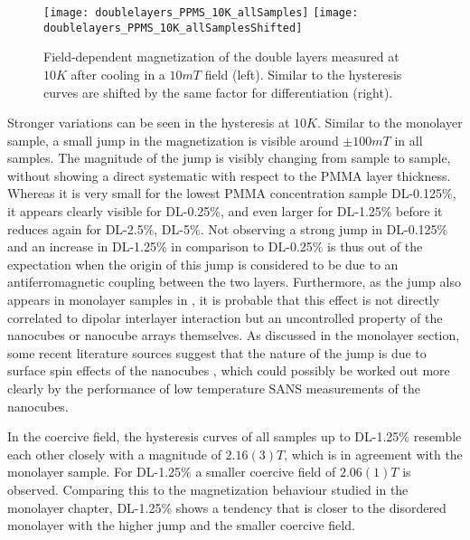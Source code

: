 \documentclass[\main/dresen_thesis.tex]{subfiles}
\begin{document}

    \begin{figure}[tb]
      \centering
      \texttt{[image: doublelayers\_PPMS\_10K\_allSamples]}
      \texttt{[image: doublelayers\_PPMS\_10K\_allSamplesShifted]}
      \caption{\label{fig:doubleLayers:10KVSM}Field-dependent magnetization of the double layers measured at $10 \unit{K}$ after cooling in a $10 \unit{mT}$ field (left). Similar to  the hysteresis curves are shifted by the same factor for differentiation (right).}
    \end{figure}
    Stronger variations can be seen in the hysteresis at $10 \unit{K}$.
    Similar to the monolayer sample, a small jump in the magnetization is visible around $\pm 100 \unit{mT}$ in all samples.
    The magnitude of the jump is visibly changing from sample to sample, without showing a direct systematic with respect to the PMMA layer thickness.
    Whereas it is very small for the lowest PMMA concentration sample DL-0.125\%, it appears clearly visible for DL-0.25\%, and even larger for DL-1.25\% before it reduces again for DL-2.5\%, DL-5\%.
    Not observing a strong jump in DL-0.125\% and an increase in DL-1.25\% in comparison to DL-0.25\% is thus out of the expectation when the origin of this jump is considered to be due to an antiferromagnetic coupling between the two layers.
    Furthermore, as the jump also appears in monolayer samples in , it is probable that this effect is not directly correlated to dipolar interlayer interaction but an uncontrolled property of the nanocubes or nanocube arrays themselves.
    As discussed in the monolayer section, some recent literature sources suggest that the nature of the jump is due to surface spin effects of the nanocubes \cite{Xu_2015_Simul, Fu_2012_Uniqu}, which could possibly be worked out more clearly by the performance of low temperature SANS measurements of the nanocubes.

    In the coercive field, the hysteresis curves of all samples up to DL-1.25\% resemble each other closely with a  magnitude of $2.16(3) \unit{T}$, which is in agreement with the monolayer sample.
    For DL-1.25\% a smaller coercive field of $2.06(1) \unit{T}$ is observed.
    Comparing this to the magnetization behaviour studied in the monolayer chapter, DL-1.25\% shows a tendency that is closer to the disordered monolayer with the higher jump and the smaller coercive field.
  \\
\end{document}
